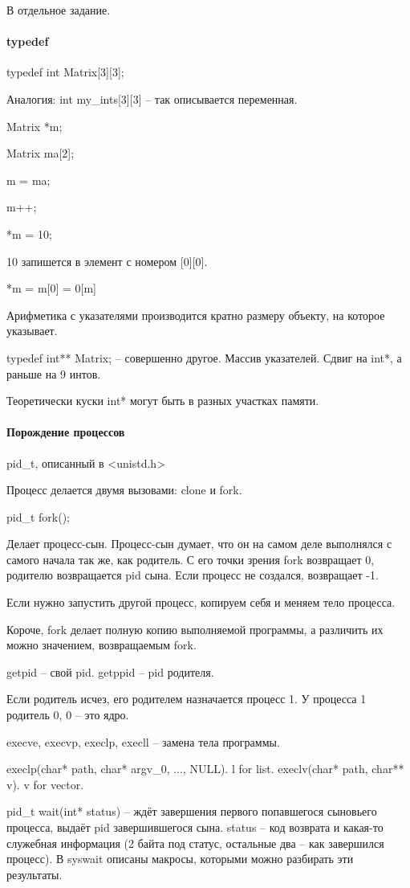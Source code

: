 \documentclass[a4paper,10pt]{article}
\begin{document}
В отдельное задание.
\paragraph{typedef}
typedef int Matrix[3][3];

Аналогия: int my\_ints[3][3] -- так описывается переменная.

Matrix *m;

Matrix ma[2];

m = ma;

m++;

*m = 10;

10 запишется в элемент с номером [0][0].

*m = m[0] = 0[m]

Арифметика с указателями производится кратно размеру объекту, на которое 
указывает.

typedef int** Matrix; -- совершенно другое. Массив указателей. Сдвиг на int*, а раньше на 9 интов.

Теоретически куски int* могут быть в разных участках памяти.

\paragraph{Порождение процессов}
pid\_t, описанный в <unistd.h>

Процесс делается двумя вызовами: clone и fork.

pid\_t fork();

Делает процесс-сын. Процесс-сын думает, что он на самом деле выполнялся с самого начала так же, как родитель. С его точки зрения fork возвращает 0, родителю возвращается pid сына. Если процесс не создался, возвращает -1.

Если нужно запустить другой процесс, копируем себя и меняем тело процесса.

Короче, fork делает полную копию выполняемой программы, а различить их можно значением, возвращаемым fork.

getpid -- свой pid. getppid -- pid родителя.

Если родитель исчез, его родителем назначается процесс 1. У процесса 1 родитель 0, 0 -- это ядро.

execve, execvp, execlp, execll -- замена тела программы.

execlp(char* path, char* argv\_0, ..., NULL). l for list.
execlv(char* path, char** v). v for vector.

pid\_t wait(int* status) -- ждёт завершения первого попавшегося сыновьего процесса, выдаёт pid завершившегося сына. status -- код возврата и какая-то служебная информация (2 байта под статус, остальные два -- как завершился процесс). В syswait описаны макросы, которыми можно разбирать эти результаты.
\end{document}
